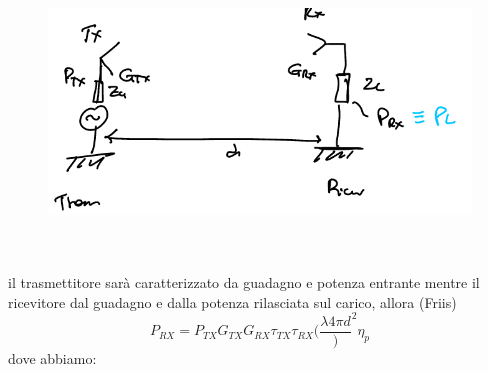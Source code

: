 \documentclass[oneside, 12pt]{extbook}
\begin{document}
\begin{figure}[!h]
	\includegraphics[scale=0.3]{immagini/tx_rx_far.png}
\end{figure}\\\\
il trasmettitore sarà caratterizzato da guadagno e potenza entrante mentre il ricevitore dal guadagno e dalla potenza rilasciata sul carico, allora (Friis)
\begin{equation}
	P_{RX} = P_{TX} G_{TX} G_{RX} \tau_{TX} \tau_{RX} (\frac{\lambda4\pi d})^2 \eta_p
\end{equation}
dove abbiamo:
\end{document}
